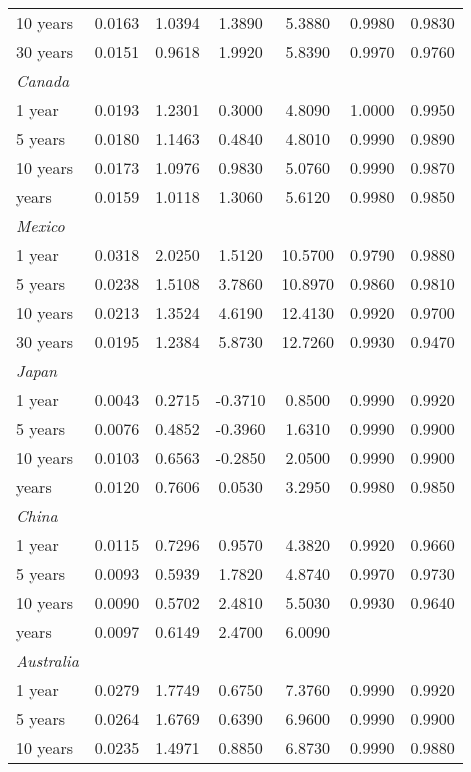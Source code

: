 \documentclass{article}
\begin{document}
\begin{table}[ht]
\begin{tabular}{l c c c c c c}
10 years	&	0.0163	&	1.0394	&	1.3890	&	5.3880	&	0.9980	&	0.9830	\\
30 years	&	0.0151	&	0.9618	&	1.9920	&	5.8390	&	0.9970	&	0.9760	\\
\textit{Canada}	&		&		&		&		&		&		\\
1 year	&	0.0193	&	1.2301	&	0.3000	&	4.8090	&	1.0000	&	0.9950	\\
5 years	&	0.0180	&	1.1463	&	0.4840	&	4.8010	&	0.9990	&	0.9890	\\
10 years	&	0.0173	&	1.0976	&	0.9830	&	5.0760	&	0.9990	&	0.9870	\\
\medskip													
30 years	&	0.0159	&	1.0118	&	1.3060	&	5.6120	&	0.9980	&	0.9850	\\
\textit{Mexico}	&		&		&		&		&		&		\\
1 year	&	0.0318	&	2.0250	&	1.5120	&	10.5700	&	0.9790	&	0.9880	\\
5 years	&	0.0238	&	1.5108	&	3.7860	&	10.8970	&	0.9860	&	0.9810	\\
10 years	&	0.0213	&	1.3524	&	4.6190	&	12.4130	&	0.9920	&	0.9700	\\
30 years	&	0.0195	&	1.2384	&	5.8730	&	12.7260	&	0.9930	&	0.9470	\\
\textit{Japan}	&		&		&		&		&		&		\\
1 year	&	0.0043	&	0.2715	&	-0.3710	&	0.8500	&	0.9990	&	0.9920	\\
5 years	&	0.0076	&	0.4852	&	-0.3960	&	1.6310	&	0.9990	&	0.9900	\\
10 years	&	0.0103	&	0.6563	&	-0.2850	&	2.0500	&	0.9990	&	0.9900	\\
\medskip													
30 years	&	0.0120	&	0.7606	&	0.0530	&	3.2950	&	0.9980	&	0.9850	\\
\textit{China}	&		&		&		&		&		&		\\
1 year	&	0.0115	&	0.7296	&	0.9570	&	4.3820	&	0.9920	&	0.9660	\\
5 years	&	0.0093	&	0.5939	&	1.7820	&	4.8740	&	0.9970	&	0.9730	\\
10 years	&	0.0090	&	0.5702	&	2.4810	&	5.5030	&	0.9930	&	0.9640	\\
\medskip													
30 years	&	0.0097	&	0.6149	&	2.4700	&	6.0090	&		&		\\
\textit{Australia}	&		&		&		&		&		&		\\
1 year	&	0.0279	&	1.7749	&	0.6750	&	7.3760	&	0.9990	&	0.9920	\\
5 years	&	0.0264	&	1.6769	&	0.6390	&	6.9600	&	0.9990	&	0.9900	\\
10 years	&	0.0235	&	1.4971	&	0.8850	&	6.8730	&	0.9990	&	0.9880	\\

\end{tabular}
\end{table}
\end{document}
